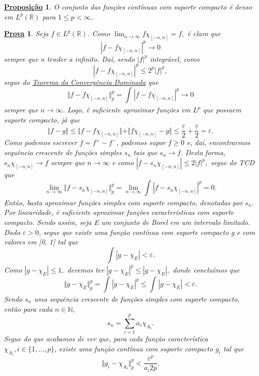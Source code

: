 \documentclass{article}
\newtheorem*{prop*}{\underline{Proposi\c c\~ao}}
\newtheorem*{proof*}{\underline{Prova}}
\begin{document}
\begin{prop*}
  O conjunto das funções contínuas com suporte compacto é denso em \(L^{p}(\mathbb{R})\) para \(1\leq p < \infty\).
\end{prop*}
\begin{proof*}
  Seja \(f\in L^{p}(\mathbb{R})\). Como \(\lim_{n\to \infty}f \chi_{[-n, n]} = f,\) é claro que 
    \[
      |f-f\chi_{[-n, n]}|^{p}\to 0
    \]
  sempre que n tender a infinito. Daí, sendo \(|f|^{p}\) integrável, como 
    \[
      |f-f\chi_{[-n, n]}|^{p}\leq 2^{p}|f|^{p},
    \]
  segue do \hyperlink{dominated_convergence}{\textit{Teorema da Convergência Dominada}} que 
    \[
      \Vert f - f\chi_{[-n, n]} \Vert_{p}^{p} = \int_{}^{}|f-f\chi_{[-n, n]}|^{p}\to 0
    \]
  sempre que \(n\to \infty\). Logo, é suficiente aproximar funções em \(L^{p}\) que possuem suporte compacto, já que 
    \[
      \Vert f -g  \Vert \leq \Vert f - f\chi_{[-n, n]} \Vert + \Vert f\chi_{[-n, n]} - g \Vert \leq \frac{\varepsilon }{2} + \frac{\varepsilon }{2} = \varepsilon.
    \]
  Como podemos escrever \(f=f^{+}-f^{-}\), podemos supor \(f\geq 0\) e, daí, encontrarmos sequência crescente de funções simples \(s_{n}\)
  tais que \(s_{n}\to f\). Desta forma, \(s_{n}\chi_{[-n, n]}\to f\) sempre que \(n\to \infty\) e como \(|f-s_{n}\chi_{[-n, n]}|\leq 2|f|^{p},\) segue do TCD que 
    \[
      \lim_{n\to \infty}\Vert f - s_{n}\chi_{[-n, n]} \Vert_{p}^{p} = \lim_{n\to \infty}\int_{}^{}|f-s_{n}\chi_{[-n, n]}|^{p} = 0.
    \]
    Então, basta aproximar funções simples com suporte compacto, denotadas por \(s_{n}\). Por linearidade, é suficiente aproximar funções características com suporte compacto. Sendo assim, seja E um conjunto de Borel em um intervalo limitado. Dado \(\varepsilon  > 0\), segue que existe uma função contínua com suporte compacto g e com valores em [0, 1] tal que 
      \[
        \int_{}^{}|g-\chi_{E}|<\varepsilon .
      \]
    Como \(|g-\chi_{E}|\leq 1,\) devemos ter \(|g-\chi_{E}|^{p}\leq |g-\chi_{E}|,\) donde concluímos que 
      \[
        \Vert g-\chi_{E} \Vert_{p}^{p} = \int_{}^{}|g-\chi_{E}|^{p} \leq \int_{}^{}|g-\chi_{E}| < \varepsilon .
      \]
  Sendo \(s_{n}\) uma sequência crescente de funções simples com suporte compacto, então para cada \(n\in \mathbb{N},\) 
    \[
      s_{n} = \sum\limits_{i=1}^{p}a_{i}\chi_{A_{i}}.
    \]
    Segue do que acabamos de ver que, para cada função característica \(\chi_{A_{i}}, i\in \{1, \dotsc , p\}\), existe uma função contínua com suporte compacto \(g_{i}\) tal que 
      \[
        \Vert g_{i}-\chi_{A_{i}} \Vert_{p}^{p}<\frac{\varepsilon ^{p}}{a_{i}2p}.
\]
\end{proof*}
\end{document}
